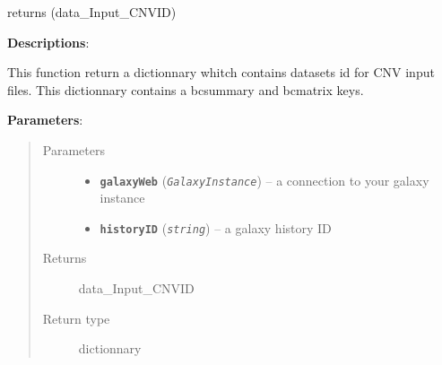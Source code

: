 \documentclass[letterpaper,10pt,english]{sphinxmanual}
\begin{document}
\begin{fulllineitems}
\label{datamanagerpkg:datamanagerpkg.GalaxyCommunication_data_manager.CNV_Input_Dict}
returns (data\_Input\_CNVID)

\textbf{Descriptions}:

This function return a dictionnary whitch contains datasets id for 
CNV input files. This dictionnary contains a bcsummary and bcmatrix keys.

\textbf{Parameters}:
\begin{quote}\begin{description}
\item[{Parameters}] \leavevmode\begin{itemize}
\item {} 
\textbf{\texttt{galaxyWeb}} (\emph{\texttt{GalaxyInstance}}) -- a connection to your galaxy instance

\item {} 
\textbf{\texttt{historyID}} (\emph{\texttt{string}}) -- a galaxy history ID

\end{itemize}

\item[{Returns}] \leavevmode
data\_Input\_CNVID

\item[{Return type}] \leavevmode
dictionnary

\end{description}\end{quote}

\end{fulllineitems}

\end{document}
